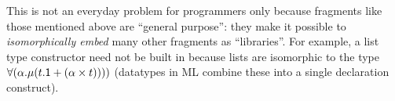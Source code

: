 \documentclass[pldi]{sigplanconf-pldi15}
\begin{document}
This is not an everyday problem for programmers only because fragments like those mentioned above are ``general purpose'': they make it possible to \emph{isomorphically embed}  many other fragments as ``libraries''. For example, a list type constructor need not be built in because lists are isomorphic to the type $\forall(\alpha.\mu(t.{\sf 1} + (\alpha \times t))))$ (datatypes in ML combine these into a single declaration construct). %
\end{document}
